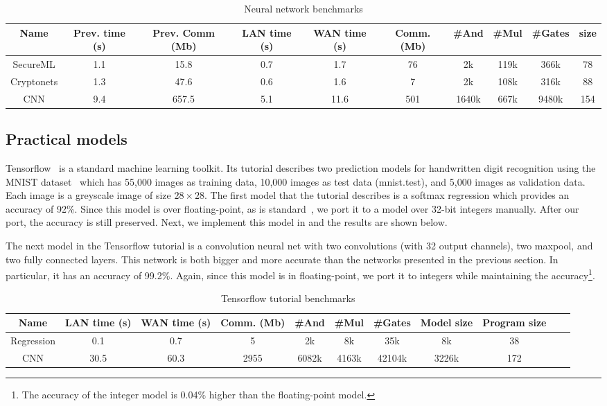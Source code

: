 \begin{table*}
\begin{tabular}{c|c|c|c |c|c|c|c|c|c}
Name  & Prev. time (s) & Prev. Comm (Mb) & LAN time (s) & WAN time (s) & Comm. (Mb)  & \#And & \#Mul & \#Gates & size\\
\hline
SecureML   &  1.1 & 15.8 & 0.7 & 1.7  & 76   &  2k   & 119k & 366k   & 78\\
\hline
Cryptonets &  1.3 & 47.6 & 0.6 & 1.6  & 7    & 2k    & 108k & 316k & 88\\
\hline
CNN        &  9.4 & 657.5& 5.1 & 11.6 & 501  & 1640k & 667k & 9480k & 154\\
\hline
\end{tabular}

 \caption{Neural network benchmarks}
 \label{tab:lcd} 
\end{table*}


\subsection{Practical models}
Tensorflow~\cite{tensorflow} is a standard machine learning toolkit.
Its tutorial describes two prediction models for handwritten digit recognition
using the MNIST dataset~\cite{mnist} which has 55,000 images as training data,
10,000 images as test data (mnist.test), and 5,000 images as validation data.
Each image is a greyscale image of size $28\times 28$.
The first model that the tutorial describes is a softmax regression
which provides an accuracy of 92\%. Since this model is over floating-point,
as is standard~\cite{secureml,minionn}, we port it to a model over 32-bit integers manually. After our port, the accuracy is still preserved.
Next, we implement this model in \tool and the results are shown below.

The next model in the Tensorflow tutorial is a convolution neural net with two convolutions
(with 32 output channels), two maxpool, and two fully connected layers.
This network is both bigger and more accurate than the networks presented in the previous section.
In particular, it has an accuracy of 99.2\%. Again, since this model is in floating-point,
we port it to integers while maintaining the accuracy\footnote{The accuracy of the integer model is 0.04\% higher than the floating-point model.}.


\begin{table*}
\begin{tabular}{c|c|c|c |c|c|c|c|c|c | c}
Name       & LAN time (s) & WAN time (s) & Comm. (Mb)  & \#And & \#Mul & \#Gates & Model size & Program size\\
\hline
Regression &  0.1         & 0.7         & 5            & 2k    & 8k    &  35k    & 8k   & 38\\
\hline
CNN        &  30.5        & 60.3        & 2955         & 6082k & 4163k &  42104k & 3226k& 172\\
\hline
\end{tabular}

 \caption{Tensorflow tutorial benchmarks}
 \label{tab:lcd} 
\end{table*}


